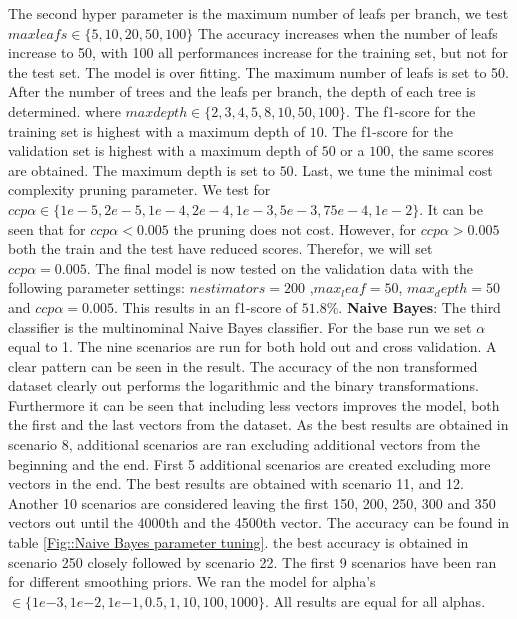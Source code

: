 \documentclass[11pt]{article}
\begin{document}
The second hyper parameter is the maximum number of leafs per branch, we test $max leafs \in \{5,10, 20, 50, 100\}$ The accuracy increases when the number of leafs increase to 50, with 100 all performances increase for the training set, but not for the test set. The model is over fitting. The maximum number of leafs is set to 50.   
\newline
After the number of trees and the leafs per branch, the depth of each tree is determined. where $max depth \in \{2, 3, 4, 5, 8, 10, 50, 100\}$. The f1-score for the training set is highest with a maximum depth of $10$. The f1-score for the validation set is highest with a maximum depth of $50$ or a $100$, the same scores are obtained. The maximum depth is set to $50$. 
\newline
Last, we tune the minimal cost complexity pruning parameter. We test for $ccp  \alpha \in \{1e-5, 2e-5, 1e-4, 2e-4, 1e-3, 5e-3, 75e-4, 1e-2\}$. It can be seen that for $ccp \alpha < 0.005$ the pruning does not cost. However, for $ccp \alpha > 0.005$ both the train and the test have reduced scores. Therefor, we will set $ccp \alpha=0.005$.   
%
The final model is now tested on the validation data with the following parameter settings:
$n estimators = 200$ ,$max_leaf = 50$, $max_depth = 50$ and $ccp \alpha = 0.005$. This results in an f1-score of $51.8\%$.
\newline 
\textbf{Naive Bayes}: The third classifier is the multinominal Naive Bayes classifier. For the base run we set $\alpha$ equal to 1. The nine scenarios are run for both hold out and cross validation. A clear pattern can be seen in the result. The accuracy of the non transformed dataset clearly out performs the logarithmic and the binary transformations. Furthermore it can be seen that including less vectors improves the model, both the first and the last vectors from the dataset. As the best results are obtained in scenario 8, additional scenarios are ran excluding additional vectors from the beginning and the end.  
\newline
First 5 additional scenarios are created excluding more vectors in the end. The best results are obtained with scenario 11, and 12. Another 10 scenarios are considered leaving the first 150, 200, 250, 300 and 350 vectors out until the 4000th and the 4500th vector. The accuracy can be found in table \ref{Fig::Naive Bayes parameter tuning}. the best accuracy is obtained in scenario 250 closely followed by scenario 22.
\newline
The first 9 scenarios have been ran for different smoothing priors. We ran the model for alpha's $\in \{1e{-3}, 1e{-2}, 1e{-1}, 0.5, 1, 10, 100, 1000\}$. All results are equal for all alphas.  
\end{document}
